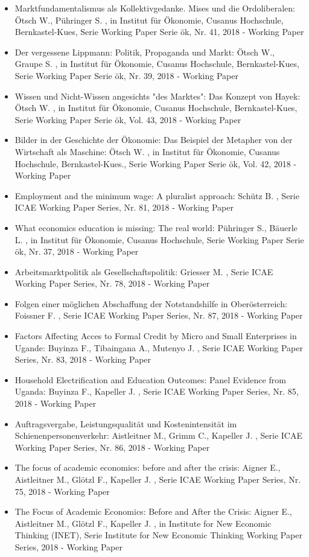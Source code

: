  \begin{itemize} 
	 \item Marktfundamentalismus als Kollektivgedanke. Mises und die Ordoliberalen: Ötsch W., Pühringer S. , in Institut für Ökonomie, Cusanus Hochschule, Bernkastel-Kues, Serie Working Paper Serie ök, Nr. 41, 2018 - Working Paper
	 \item Der vergessene Lippmann: Politik, Propaganda und Markt: Ötsch W., Graupe S. , in Institut für Ökonomie, Cusanus Hochschule, Bernkastel-Kues, Serie Working Paper Serie ök, Nr. 39, 2018 - Working Paper
	 \item Wissen und Nicht-Wissen angesichts "des Marktes": Das Konzept von Hayek: Ötsch W. , in Institut für Ökonomie, Cusanus Hochschule, Bernkastel-Kues, Serie Working Paper Serie ök, Vol. 43, 2018 - Working Paper
	 \item Bilder in der Geschichte der Ökonomie: Das Beispiel der Metapher von der Wirtschaft als Maschine: Ötsch W. , in Institut für Ökonomie, Cusanus Hochschule, Bernkastel-Kues., Serie Working Paper Serie ök, Vol. 42, 2018 - Working Paper
	 \item Employment and the minimum wage: A pluralist approach: Schütz B. , Serie ICAE Working Paper Series, Nr. 81, 2018 - Working Paper
	 \item What economics education is missing: The real world: Pühringer S., Bäuerle L. , in Institut für Ökonomie, Cusanus Hochschule, Serie Working Paper Serie ök, Nr. 37, 2018 - Working Paper
	 \item Arbeitsmarktpolitik als Gesellschaftspolitik: Griesser M. , Serie ICAE Working Paper Series, Nr. 78, 2018 - Working Paper
	 \item Folgen einer möglichen Abschaffung der Notstandshilfe in Oberösterreich: Foissner F. , Serie ICAE Working Paper Series, Nr. 87, 2018 - Working Paper
	 \item Factors Affecting Acces to Formal Credit by Micro and Small Enterprises in Ugande: Buyinza F., Tibaingana A., Mutenyo J. , Serie ICAE Working Paper Series, Nr. 83, 2018 - Working Paper
	 \item Household Electrification and Education Outcomes: Panel Evidence from Uganda: Buyinza F., Kapeller J. , Serie ICAE Working Paper Series, Nr. 85, 2018 - Working Paper
	 \item Auftragsvergabe, Leistungsqualität und Kostenintensität im Schienenpersonenverkehr: Aistleitner M., Grimm C., Kapeller J. , Serie ICAE Working Paper Series, Nr. 86, 2018 - Working Paper
	 \item The focus of academic economics: before and after the crisis: Aigner E., Aistleitner M., Glötzl F., Kapeller J. , Serie ICAE Working Paper Series, Nr. 75, 2018 - Working Paper
	 \item The Focus of Academic Economics: Before and After the Crisis: Aigner E., Aistleitner M., Glötzl F., Kapeller J. , in Institute for New Economic Thinking (INET), Serie Institute for New Economic Thinking  Working Paper Series, 2018 - Working Paper
\end{itemize} 

